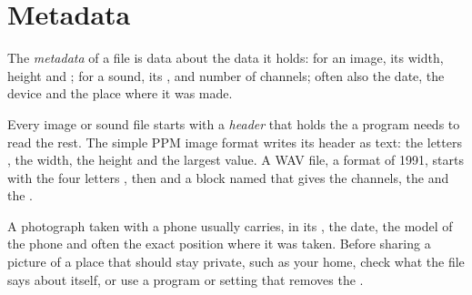 \section{Metadata}\label{sec:g10:images-sound-compression:metadata}

\begin{definition}[Metadata]\label{def:g10:images-sound-compression:metadata}
The \emph{metadata} of a file is data about the data it holds: for an image, its width, height and
; for a sound, its ,  and number of channels; often also the date, the device and
the place where it was made.
\end{definition}

Every image or sound file starts with a \emph{header} that holds the  a program needs to read the rest.
The simple PPM image format writes its header as text: the letters , the width, the height and the largest
value. A WAV file, a format of 1991, starts with the four letters , then  and a block named
 that gives the channels, the  and the .

\label{lst:g10:images-sound-compression:read-header}

\label{out:g10:images-sound-compression:read-header}

\begin{safety}
A photograph taken with a phone usually carries, in its , the date, the model of the phone and often the
exact position where it was taken. Before sharing a picture of a place that should stay private, such as your home,
check what the file says about itself, or use a program or setting that removes the .
\end{safety}

